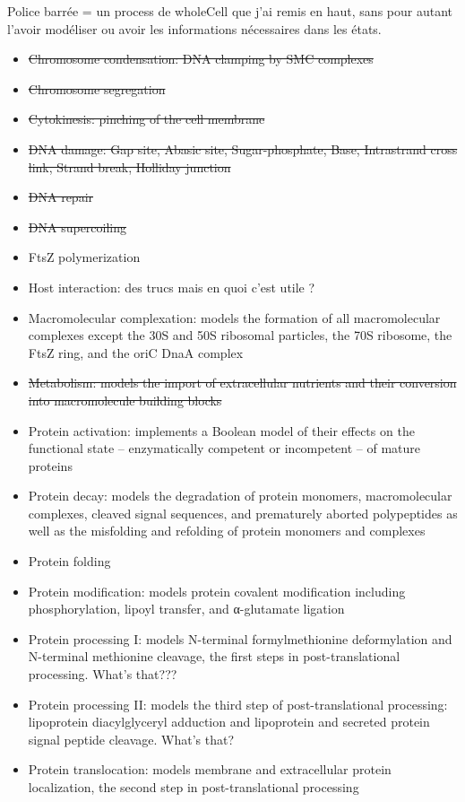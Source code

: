 Police barr\'{e}e = un process de wholeCell que j'ai remis en haut, sans pour autant l'avoir mod\'{e}liser ou avoir les informations n\'{e}cessaires dans les \'{e}tats.
\begin{itemize}
  \item \sout{Chromosome condensation: DNA clamping by SMC complexes}
  \item \sout{Chromosome segregation}
  \item \sout{Cytokinesis: pinching of the cell membrane}
  \item \sout{DNA damage: Gap site, Abasic site, Sugar-phosphate, Base, Intrastrand cross link, Strand break, Holliday junction}
  \item \sout{DNA repair}
  \item \sout{DNA supercoiling}
  \item FtsZ polymerization
  \item Host interaction: des trucs mais en quoi c'est utile ?
  \item Macromolecular complexation: models the formation of all macromolecular complexes except the 30S and 50S ribosomal particles, the 70S ribosome, the FtsZ ring, and the oriC DnaA complex
  \item \sout{Metabolism: models the import of extracellular nutrients and their conversion into macromolecule building blocks}
  \item Protein activation:  implements a Boolean model of their effects on the functional state – enzymatically competent or incompetent – of mature proteins
  \item Protein decay: models the degradation of protein monomers, macromolecular complexes, cleaved signal sequences, and prematurely aborted polypeptides as well as the misfolding and refolding of protein monomers and complexes
  \item Protein folding
  \item Protein modification: models protein covalent modification including phosphorylation, lipoyl transfer, and α-glutamate ligation
  \item Protein processing I: models N-terminal formylmethionine deformylation and N-terminal methionine cleavage, the first steps in post-translational processing. What's that???
  \item Protein processing II: models the third step of post-translational processing: lipoprotein diacylglyceryl adduction and lipoprotein and secreted protein signal peptide cleavage. What's that?
  \item Protein translocation: models membrane and extracellular protein localization, the second step in post-translational processing

\end{itemize}
